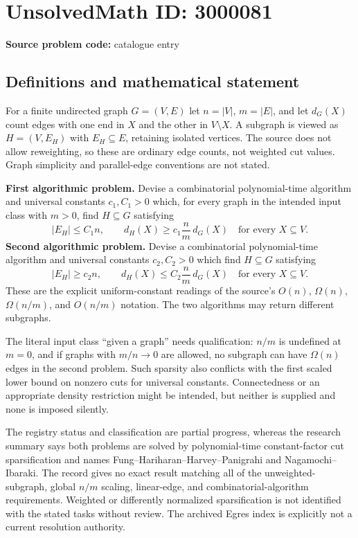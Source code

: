 \documentclass[11pt]{article}
\begin{document}
\section*{UnsolvedMath ID: 3000081}
\textbf{Source problem code:} catalogue entry
\subsection{Definitions and mathematical statement}
For a finite undirected graph $G=(V,E)$ let $n=|V|$, $m=|E|$, and let $d_G(X)$ count edges with one end in $X$ and the other in $V\setminus X$. A subgraph is viewed as $H=(V,E_H)$ with $E_H\subseteq E$, retaining isolated vertices. The source does not allow reweighting, so these are ordinary edge counts, not weighted cut values. Graph simplicity and parallel-edge conventions are not stated.

\textbf{First algorithmic problem.} Devise a combinatorial polynomial-time algorithm and universal constants $c_1,C_1>0$ which, for every graph in the intended input class with $m>0$, find $H\subseteq G$ satisfying
\[
 |E_H|\leq C_1n,\qquad
 d_H(X)\geq c_1\frac nm\,d_G(X)\quad\text{for every }X\subseteq V.
\]
\textbf{Second algorithmic problem.} Devise a combinatorial polynomial-time algorithm and universal constants $c_2,C_2>0$ which find $H\subseteq G$ satisfying
\[
 |E_H|\geq c_2n,\qquad
 d_H(X)\leq C_2\frac nm\,d_G(X)\quad\text{for every }X\subseteq V.
\]
These are the explicit uniform-constant readings of the source's $O(n)$, $\Omega(n)$, $\Omega(n/m)$, and $O(n/m)$ notation. The two algorithms may return different subgraphs.

The literal input class ``given a graph'' needs qualification: $n/m$ is undefined at $m=0$, and if graphs with $m/n\to0$ are allowed, no subgraph can have $\Omega(n)$ edges in the second problem. Such sparsity also conflicts with the first scaled lower bound on nonzero cuts for universal constants. Connectedness or an appropriate density restriction might be intended, but neither is supplied and none is imposed silently.

The registry status and classification are partial progress, whereas the research summary says both problems are solved by polynomial-time constant-factor cut sparsification and names Fung--Hariharan--Harvey--Panigrahi and Nagamochi--Ibaraki. The record gives no exact result matching all of the unweighted-subgraph, global $n/m$ scaling, linear-edge, and combinatorial-algorithm requirements. Weighted or differently normalized sparsification is not identified with the stated tasks without review. The archived Egres index is explicitly not a current resolution authority.
\end{document}
